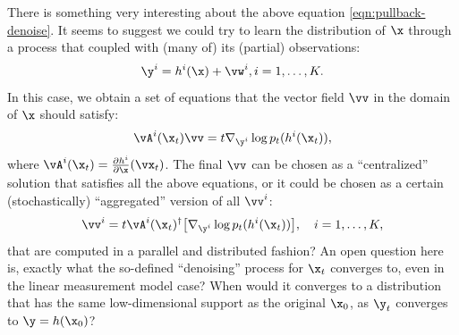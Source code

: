 \documentclass[../../book-main.tex]{subfiles}
\begin{document}
\begin{remark}
{There is something very interesting about the above equation \eqref{eqn:pullback-denoise}. It seems to suggest we could try to learn the distribution of $\x$ through a process that coupled with (many of) its (partial) observations:
\begin{equation}
\y^i = h^i(\x) +\vw^i, i =1, \ldots, K.
\end{equation} In this case, we obtain a set of equations that the vector field $\vv$ in the domain of $\x$ should satisfy:
\begin{equation}
    \vA^i(\x_t) \vv = t \nabla_{\y^i} \log p_t(h^i(\x_t)),
\label{eqn:federated-pushforward}
\end{equation}
where $\vA^i(\x_t) = \frac{\partial h^i}{\partial \x}(\vx_t)$. The final $\vv$ can be chosen as a ``centralized'' solution that satisfies all the above equations, or it could be chosen as a certain (stochastically) ``aggregated'' version of all $\vv^i$:
\begin{equation}
    \vv^i = t\vA^i(\x_t)^\dagger \big[\nabla_{\y^i} \log p_t(h^i(\x_t))\big], \quad i = 1, \ldots, K,
\end{equation}
that are computed in a parallel and distributed fashion? An open question here is, exactly what the so-defined ``denoising'' process for $\x_t$ converges to, even in the linear measurement model case? When would it converges to a  distribution that has the same low-dimensional support as the original $\x_0$, as $\y_t$ converges to $\y = h(\x_0)$? }
\end{remark}

\end{document}
